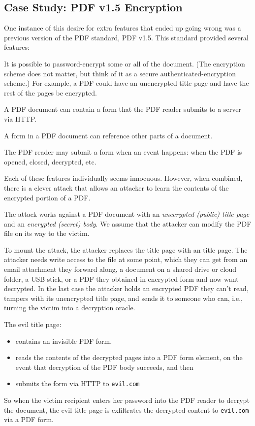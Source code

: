 \subsection{Case Study: PDF v1.5 Encryption}
One instance of this desire for extra features
that ended up going wrong was a previous version
of the PDF standard, PDF v1.5.\autocite{muller2019practical}
This standard provided several features:
\begin{compactenum}
	\item It is possible to password-encrypt some or all of the document.
        (The encryption scheme does not matter, but think of it as
        a secure authenticated-encryption scheme.)
        For example, a PDF could have an unencrypted title page 
        and have the rest of the pages be encrypted.
	\item A PDF document can contain a form that the PDF reader
        submits to a server via HTTP.
	\item A form in a PDF document can reference other parts of a document.
	\item The PDF reader may submit a form when an event happens:
        when the PDF is opened, closed, decrypted, etc.
\end{compactenum}

Each of these features individually seems innocuous.
However, when combined, there is a clever attack that allows an attacker to 
learn the contents of the encrypted portion of a PDF.

The attack works against a PDF document with an \emph{unecrypted (public)
title page}
and an \emph{encrypted (secret) body}.
We assume that the attacker can modify the PDF 
file on its way to the victim.

To mount the attack, the attacker replaces the
title page with an  title page.
The attacker needs write access to the file at some point, which they can get
from an email attachment they forward along, a document on a shared drive
or cloud folder, a USB stick, or a PDF they obtained in encrypted form and
now want decrypted. In the last case the attacker holds an encrypted PDF
they can't read, tampers with its unencrypted title page, and sends it
to someone who can, i.e., turning the victim into a decryption oracle.

The evil title page:
\begin{itemize}[noitemsep]
    \item contains an invisible PDF form,
    \item reads the contents of the decrypted pages into a PDF form element,
          on the event that decryption of the PDF body succeeds, 
          and then
    \item submits the form via HTTP to \texttt{evil.com}
\end{itemize}
So when the victim recipient enters her password into the PDF
reader to decrypt the document, the evil title page is exfiltrates
the decrypted content to \texttt{evil.com} via a PDF form.

